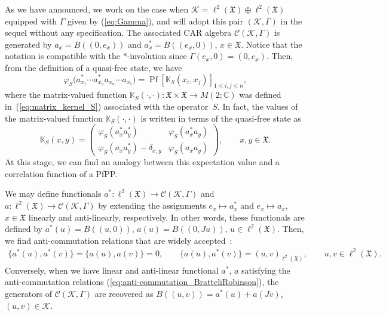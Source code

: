 \documentclass[11pt]{article}
\numberwithin{equation}{section}
\numberwithin{equation}{section}
\newcommand{\pf}{\operatorname{Pf}}
\newcommand{\mfrak}[1]{\mathfrak{#1}}
\newcommand{\mcal}[1]{\mathcal{#1}}
\newcommand{\mbb}[1]{\mathbb{#1}}
\begin{document}
As we have announced, we work on the case when $\mcal{K}=\ell^{2}(\mfrak{X})\oplus\ell^{2}(\mfrak{X})$ equipped with $\Gamma$ given by (\ref{eq:Gamma}), and will adopt this pair $(\mcal{K},\Gamma)$ in the sequel without any specification.
The associated CAR algebra $\mcal{C}(\mcal{K},\Gamma)$ is generated by $a_{x}=B((0,e_{x}))$ and $a_{x}^{\ast}=B((e_{x},0))$, $x\in\mfrak{X}$.
Notice that the notation is compatible with the $\ast$-involution since $\Gamma (e_{x},0)=(0,e_{x})$.
Then, from the definition of a quasi-free state, we have
\begin{equation}
\label{eq:quasifree_correlation_function}
	\varphi_{S}\big(a_{x_{1}}^{\ast} \cdots a_{x_{n}}^{\ast}a_{x_{n}}\cdots a_{x_{1}}\big)=\pf [\mbb{K}_{S}(x_{i},x_{j}) ]_{1\le i,j\le n},
\end{equation}
where the matrix-valued function $\mbb{K}_{S}(\cdot,\cdot)\colon \mfrak{X}\times\mfrak{X}\to M(2;\mbb{C})$ was defined in~(\ref{eq:matrix_kernel_S}) associated with the operator~$S$. In fact, the values of the matrix-valued function $\mbb{K}_{S}(\cdot,\cdot)$ is written in terms of the quasi-free state as
\begin{equation*}
	\mbb{K}_{S}(x,y)=\left(
	\begin{matrix}
	\varphi_{S}(a_{x}^{\ast}a_{y}^{\ast}) & \varphi_{S}(a_{x}^{\ast}a_{y}) \\
	\varphi_{S}(a_{x}a_{y}^{\ast})-\delta_{x,y} & \varphi_{S}(a_{x}a_{y})
	\end{matrix}
	\right),\qquad x,y\in\mfrak{X}.
\end{equation*}
At this stage, we can find an analogy between this expectation value and a correlation function of a PfPP.

\begin{Remark}\label{rem:equivalence_CAR}
We may define functionals $a^{\ast}\colon \ell^{2}(\mfrak{X})\to \mcal{C}(\mcal{K},\Gamma)$ and $a\colon \ell^{2}(\mfrak{X})\to \mcal{C}(\mcal{K},\Gamma)$ by extending the assignments $e_{x}\mapsto a_{x}^{\ast}$ and $e_{x}\mapsto a_{x}$, $x\in\mfrak{X}$ linearly and anti-linearly, respectively. In other words, these functionals are defined by $a^{\ast}(u)=B((u,0))$, $a(u)=B((0,Ju))$, $u\in \ell^{2}(\mfrak{X})$.
Then, we find anti-commutation relations that are widely accepted~\cite{BratteliRobinson1997}:
\begin{gather}\label{eq:anti-commutation_BratteliRobinson}
	 \{a^{\ast}(u),a^{\ast}(v)\}=\{a(u),a(v)\}=0, \qquad
	 \{a(u),a^{\ast}(v)\}=(u,v)_{\ell^{2}(\mfrak{X})}, \qquad u,v\in \ell^{2}(\mfrak{X}).
\end{gather}
Conversely, when we have linear and anti-linear functional $a^{\ast}$, $a$ satisfying the anti-commutation relations (\ref{eq:anti-commutation_BratteliRobinson}), the generators of $\mcal{C}(\mcal{K},\Gamma)$ are recovered as $B((u,v))=a^{\ast}(u)+a(Jv)$, $(u,v)\in\mcal{K}$.
\end{Remark}
\end{document}
